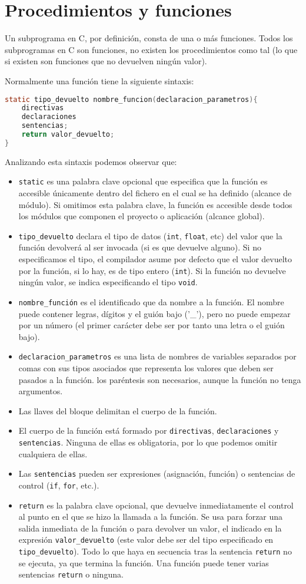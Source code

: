 \section{Procedimientos y funciones}
Un subprograma en C, por definición, consta de una o más funciones. Todos los subprogramas en C son funciones, no existen los procedimientos como tal (lo que si existen son funciones que no devuelven ningún valor).

Normalmente una función tiene la siguiente sintaxis:
\begin{lstlisting}[language=C]
static tipo_devuelto nombre_funcion(declaracion_parametros){
    directivas
    declaraciones
    sentencias;
    return valor_devuelto;
}
\end{lstlisting}
Analizando esta sintaxis podemos observar que:
\begin{itemize}
	\item \texttt{static} es una palabra clave opcional que especifica que la función es accesible únicamente dentro del fichero en el cual se ha definido (alcance de módulo). Si omitimos esta palabra clave, la función es accesible desde todos los módulos que componen el proyecto o aplicación (alcance global).
	\item \texttt{tipo\_devuelto} declara el tipo de datos (\texttt{int}, \texttt{float}, etc) del valor que la función devolverá al ser invocada (si es que devuelve alguno). Si no especificamos el tipo, el compilador asume por defecto que el valor devuelto por la función, si lo hay, es de tipo entero (\texttt{int}). Si la función no devuelve ningún valor, se indica especificando el tipo \texttt{void}.
	\item \texttt{nombre\_función} es el identificado que da nombre a la función. El nombre puede contener legras, dígitos y el guión bajo ('\_'), pero no puede empezar por un número (el primer carácter debe ser por tanto una letra o el guión bajo).
	\item \texttt{declaracion\_parametros} es una lista de nombres de variables separados por comas con sus tipos asociados que representa los valores que deben ser pasados a la función. los paréntesis son necesarios, aunque la función no tenga argumentos.
	\item Las llaves del bloque delimitan el cuerpo de la función.
	\item El cuerpo de la función está formado por \texttt{directivas}, \texttt{declaraciones} y \texttt{sentencias}. Ninguna de ellas es obligatoria, por lo que podemos omitir cualquiera de ellas.
	\item Las \texttt{sentencias} pueden ser expresiones (asignación, función) o sentencias de control (\texttt{if}, \texttt{for}, etc.).
	\item \texttt{return} es la palabra clave opcional, que devuelve inmediatamente el control al punto en el que se hizo la llamada a la función. Se usa para forzar una salida inmediata de la función o para devolver un valor, el indicado en la expresión \texttt{valor\_devuelto} (este valor debe ser del tipo especificado en \texttt{tipo\_devuelto}). Todo lo que haya en secuencia tras la sentencia \texttt{return} no se ejecuta, ya que termina la función. Una función puede tener varias sentencias \texttt{return} o ninguna.
\end{itemize}
